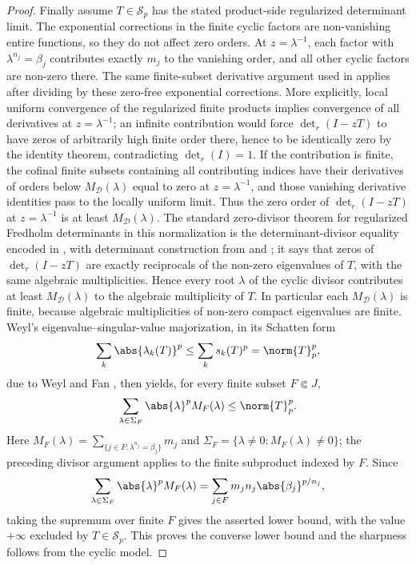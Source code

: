 \begin{proof}
  Finally assume \(T\in\mathcal S_p\) has the stated product-side
  regularized determinant limit. The exponential corrections in the finite
  cyclic factors are non-vanishing entire functions, so they do not affect
  zero orders. At \(z=\lambda^{-1}\), each factor with
  \(\lambda^{n_j}=\beta_j\) contributes exactly \(m_j\) to the vanishing
  order, and all other cyclic factors are non-zero there. The same
  finite-subset derivative argument used in
   applies after dividing
  by these zero-free exponential corrections. More explicitly, local uniform
  convergence of the regularized finite products implies convergence of all
  derivatives at \(z=\lambda^{-1}\); an infinite contribution would force
  \(\det_r(I-zT)\) to have zeros of arbitrarily high finite order there,
  hence to be identically zero by the identity theorem, contradicting
  \(\det_r(I)=1\). If the contribution is finite, the cofinal finite subsets
  containing all contributing indices have their derivatives of orders below
  \(M_{\mathcal D}(\lambda)\) equal to zero at \(z=\lambda^{-1}\), and
  those vanishing derivative identities pass to the locally uniform limit. Thus
  the zero order of \(\det_r(I-zT)\) at \(z=\lambda^{-1}\) is at least
  \(M_{\mathcal D}(\lambda)\). The standard zero-divisor theorem for
  regularized Fredholm determinants in this normalization is the
  determinant-divisor equality encoded in
  \cite[Lemma~2.15, eq.~(2.85), p.~463]{GesztesyLatushkinMitreaZinchenko2005},
  with determinant construction from \cite[Chapter~9]{Simon2005TraceIdeals}
  and \cite[Section~4.2, pp.~162--163]{GohbergKrein1969NonSelfAdjoint}; it
  says that zeros of \(\det_r(I-zT)\) are exactly reciprocals of the
  non-zero eigenvalues of \(T\), with the same algebraic multiplicities.
  Hence every root
  \(\lambda\) of the cyclic divisor contributes at least
  \(M_{\mathcal D}(\lambda)\) to the algebraic multiplicity of \(T\). In
  particular each \(M_{\mathcal D}(\lambda)\) is finite, because algebraic
  multiplicities of non-zero compact eigenvalues are finite.
  Weyl's eigenvalue--singular-value majorization, in its Schatten form
  \[
    \sum_k\abs{\lambda_k(T)}^p\le\sum_ks_k(T)^p=\norm{T}_p^p,
  \]
  due to Weyl and Fan
  \cite{Weyl1949EigenvalueInequalities,Fan1951MaximumProperties}, then
  yields, for every finite subset \(F\Subset J\),
  \[
    \sum_{\lambda\in \Sigma_F}
      \abs{\lambda}^pM_F(\lambda)
    \le\norm{T}_p^p.
  \]
  Here \(M_F(\lambda)=\sum_{\{j\in F:\lambda^{n_j}=\beta_j\}}m_j\) and
  \(\Sigma_F=\{\lambda\ne0:M_F(\lambda)\ne0\}\); the preceding divisor
  argument applies to the finite subproduct indexed by \(F\). Since
  \[
    \sum_{\lambda\in \Sigma_F}
      \abs{\lambda}^pM_F(\lambda)
    =
    \sum_{j\in F}m_jn_j\abs{\beta_j}^{p/n_j},
  \]
  taking the supremum over finite \(F\) gives the asserted lower bound, with
  the value \(+\infty\) excluded by \(T\in\mathcal S_p\).
  This proves the converse lower bound and the sharpness follows from the
  cyclic model.
\end{proof}

